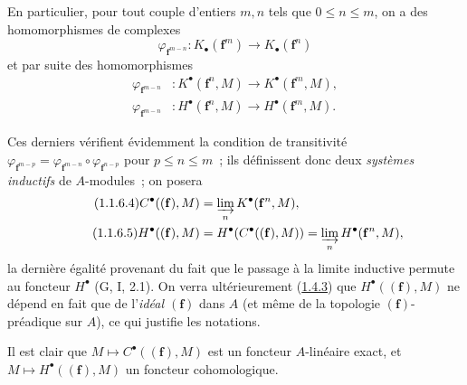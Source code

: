 \begin{env}[1.1.6]
\label{III.1.1.6-fr}
En particulier, pour tout couple d'entiers $m,n$ tels que $0\leq n\leq m$,
on a des homomorphismes de complexes
\begin{equation}
\label{III.1.1.6.1-fr}
\tag{1.1.6.1}
\varphi_{\mathbf f^{m-n}}:K_\bullet(\mathbf f^m)\longrightarrow
K_\bullet(\mathbf f^n)
\end{equation}
et par suite des homomorphismes
\begin{align}
\label{III.1.1.6.2-fr}
\tag{1.1.6.2}
\varphi_{\mathbf f^{m-n}} &:K^\bullet(\mathbf f^n,M)\longrightarrow
K^\bullet(\mathbf f^m,M),\\
\label{III.1.1.6.3-fr}
\tag{1.1.6.3}
\varphi_{\mathbf f^{m-n}} &:H^\bullet(\mathbf f^n,M)\longrightarrow
H^\bullet(\mathbf f^m,M).
\end{align}

Ces derniers vérifient évidemment la condition de transitivité
$\varphi_{\mathbf f^{m-p}}=
\varphi_{\mathbf f^{m-n}}\circ\varphi_{\mathbf f^{n-p}}$ pour $p\leq n\leq m$~;
ils définissent donc deux \emph{systèmes inductifs} de $A$-modules~; on posera
\begin{align}
\label{III.1.1.6.4-fr}
\tag{1.1.6.4}
C^\bullet((\mathbf f),M)&=\varinjlim_n K^\bullet(\mathbf f^n,M),\\
\label{III.1.1.6.5-fr}
\tag{1.1.6.5}
H^\bullet((\mathbf f),M)&=H^\bullet(C^\bullet((\mathbf f),M))
=\varinjlim_n H^\bullet(\mathbf f^n,M),
\end{align}
la dernière égalité provenant du fait que le passage à la limite inductive
permute au foncteur $H^\bullet$ (G, I, 2.1). On verra ultérieurement
(\hyperref[III.1.4.3-fr]{1.4.3}) que $H^\bullet((\mathbf f),M)$ ne dépend en
fait que de l'\emph{idéal $(\mathbf f)$} dans $A$ (et même de la topologie
$(\mathbf f)$-préadique sur $A$), ce qui justifie les notations.

Il est clair que $M\mapsto C^\bullet((\mathbf f),M)$ est un foncteur
$A$-linéaire exact, et $M\mapsto H^\bullet((\mathbf f),M)$ un foncteur
cohomologique.
\end{env}

